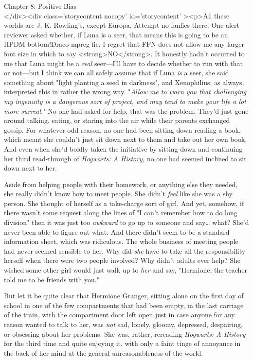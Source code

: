 
Chapter 8: Positive Bias\\
</div><div  class='storycontent nocopy' id='storycontent' ><p>All these worlds 
are J. K. Rowling's, except Europa. Attempt no fanfics there.
\sbreak
One alert reviewer asked whether, if Luna is a seer, that means this is going 
to be an HPDM bottom!Draco mpreg fic. I regret that FFN does not allow me any 
larger font size in which to say <strong>NO</strong>. It honestly hadn't 
occurred to me that Luna might be a \emph{real} seer---I'll have to decide 
whether to run with that or not---but I think we can all safely assume that if 
Luna \emph{is} a seer, she said something about "light planting a seed in 
darkness", and Xenophilius, as always, interpreted this in rather the wrong way.
\sbreak
"\emph{Allow me to warn you that challenging my ingenuity is a dangerous sort 
of project, and may tend to make your life a lot more surreal.}"
\sbreak
No one had asked for help, that was the problem. They'd just gone around 
talking, eating, or staring into the air while their parents exchanged gossip. 
For whatever odd reason, no one had been sitting down reading a book, which 
meant she couldn't just sit down next to them and take out her own book. And 
even when she'd boldly taken the initiative by sitting down and continuing her 
third read-through of \emph{Hogwarts: A History,} no one had seemed inclined to 
sit down next to her.

Aside from helping people with their homework, or anything else they needed, 
she really didn't know how to meet people. She didn't \emph{feel} like she was 
a shy person. She thought of herself as a take-charge sort of girl. And yet, 
somehow, if there wasn't some request along the lines of "I can't remember how 
to do long division" then it was just too \emph{awkward} to go up to someone 
and say{\ldots} what? She'd never been able to figure out what. And there 
didn't seem to be a standard information sheet, which was ridiculous. The whole 
business of meeting people had never seemed sensible to her. Why did \emph{she} 
have to take all the responsibility herself when there were two people 
involved? Why didn't adults ever help? She wished some other girl would just 
walk up to \emph{her} and say, "Hermione, the teacher told me to be friends 
with you."

But let it be quite clear that Hermione Granger, sitting alone on the first day 
of school in one of the few compartments that had been empty, in the last 
carriage of the train, with the compartment door left open just in case anyone 
for any reason wanted to talk to her, was \emph{not} sad, lonely, gloomy, 
depressed, despairing, or obsessing about her problems. She was, rather, 
rereading \emph{Hogwarts: A History} for the third time and quite enjoying it, 
with only a faint tinge of annoyance in the back of her mind at the general 
unreasonableness of the world.

